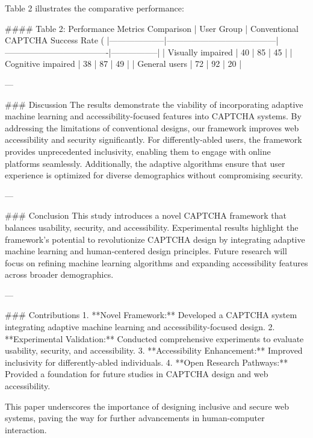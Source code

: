 Table 2 illustrates the comparative performance:

#### Table 2: Performance Metrics Comparison  
| User Group         | Conventional CAPTCHA Success Rate (%
|--------------------|---------------------------------------|-------------------------------------|-----------------|
| Visually impaired  | 40                                    | 85                                  | 45              |
| Cognitive impaired | 38                                    | 87                                  | 49              |
| General users      | 72                                    | 92                                  | 20              |

---

### Discussion  
The results demonstrate the viability of incorporating adaptive machine learning and accessibility-focused features into CAPTCHA systems. By addressing the limitations of conventional designs, our framework improves web accessibility and security significantly. For differently-abled users, the framework provides unprecedented inclusivity, enabling them to engage with online platforms seamlessly. Additionally, the adaptive algorithms ensure that user experience is optimized for diverse demographics without compromising security.

---

### Conclusion  
This study introduces a novel CAPTCHA framework that balances usability, security, and accessibility. Experimental results highlight the framework's potential to revolutionize CAPTCHA design by integrating adaptive machine learning and human-centered design principles. Future research will focus on refining machine learning algorithms and expanding accessibility features across broader demographics.

---

### Contributions  
1. **Novel Framework:** Developed a CAPTCHA system integrating adaptive machine learning and accessibility-focused design.  
2. **Experimental Validation:** Conducted comprehensive experiments to evaluate usability, security, and accessibility.  
3. **Accessibility Enhancement:** Improved inclusivity for differently-abled individuals.  
4. **Open Research Pathways:** Provided a foundation for future studies in CAPTCHA design and web accessibility.  

This paper underscores the importance of designing inclusive and secure web systems, paving the way for further advancements in human-computer interaction.